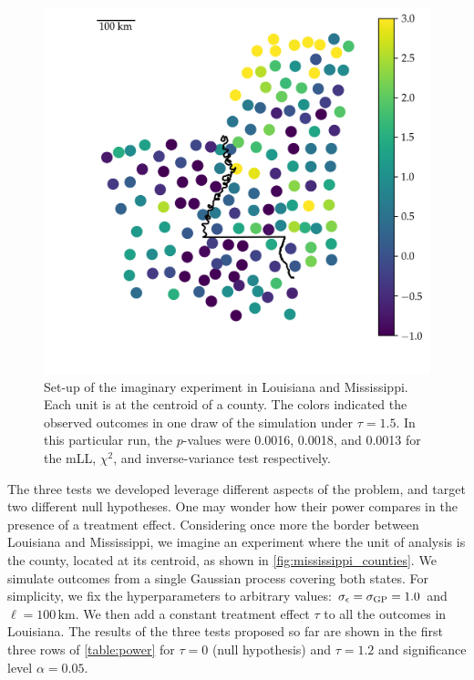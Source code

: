 \begin{figure}[tb]
    \centering
    \includegraphics[height=0.4\textheight]{../figures/mississippi_sim.png}
    \caption{
		\label{fig:mississippi_counties}
		Set-up of the imaginary experiment in Louisiana and Mississippi. Each unit is at the centroid of a county. The colors indicated the observed outcomes in one draw of the simulation under \(\tau=1.5\). In this particular run, the \(p\)-values were 0.0016, 0.0018, and 0.0013 for the mLL, \(\chi^2\), and inverse-variance test respectively.}
\end{figure}

	The three tests we developed leverage different aspects of the problem, and target two different null hypotheses. One may wonder how their power compares in the presence of a treatment effect. Considering once more the border between Louisiana and Mississippi, we imagine an experiment where the unit of analysis is the county, located at its centroid, as shown in \autoref{fig:mississippi_counties}.
We simulate outcomes from a single Gaussian process covering both states. For simplicity, we fix the hyperparameters to arbitrary values: \(\sigma_{\epsilon}=\sigma_{\mathrm{GP}}=1.0\) and \(\ell=100\,\mathrm{km}\).
We then add a constant treatment effect \(\tau\) to all the outcomes in Louisiana.
The results of the three tests proposed so far are shown in the first three rows of \autoref{table:power} for \(\tau=0\) (null hypothesis) and \(\tau=1.2\) and significance level \(\alpha=0.05\).

